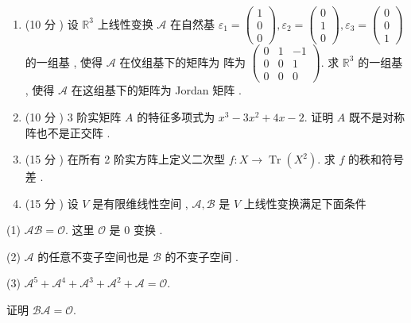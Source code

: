 \documentclass[10pt]{article}
\begin{document}
\begin{enumerate}
  \item (10  分 )  设  $\mathbb{R}^{3}$  上线性变换  $\mathscr{A}$  在自然基  $\varepsilon_{1}=\left(\begin{array}{l}1 \\ 0 \\ 0\end{array}\right), \varepsilon_{2}=\left(\begin{array}{l}0 \\ 1 \\ 0\end{array}\right), \varepsilon_{3}=\left(\begin{array}{c}0 \\ 0 \\ 1\end{array}\right)$  的一组基 ,  使得  $\mathscr{A}$  在伩组基下的矩阵为   阵为  $\left(\begin{array}{ccc}0 & 1 & -1 \\ 0 & 0 & 1 \\ 0 & 0 & 0\end{array}\right)$.  求  $\mathbb{R}^{3}$  的一组基 ,  使得  $\mathscr{A}$  在这组基下的矩阵为  Jordan  矩阵 .

  \item (10  分 ) 3  阶实矩阵  $A$  的特征多项式为  $x^{3}-3 x^{2}+4 x-2$.  证明  $A$  既不是对称阵也不是正交阵 .

  \item (15  分 )  在所有  2  阶实方阵上定义二次型  $f: X \rightarrow \operatorname{Tr}\left(X^{2}\right)$.  求  $f$  的秩和符号差 .

  \item (15  分 )  设  $V$  是有限维线性空间 , $\mathscr{A}, \mathscr{B}$  是  $V$  上线性变换满足下面条件 

\end{enumerate}
(1) $\mathscr{A} \mathscr{B}=\mathscr{O}$.  这里  $\mathscr{O}$  是  0  变换 .

(2) $\mathscr{A}$  的任意不变子空间也是  $\mathscr{B}$  的不变子空间 .

(3) $\mathscr{A}^{5}+\mathscr{A}^{4}+\mathscr{A}^{3}+\mathscr{A}^{2}+\mathscr{A}=\mathscr{O}$.

 证明  $\mathscr{B} \mathscr{A}=\mathscr{O}$.
\end{document}
